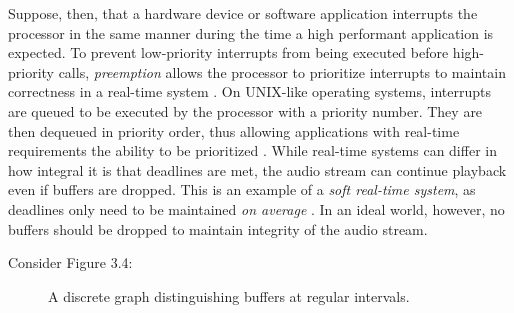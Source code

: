 Suppose, then, that a hardware device or software application interrupts the processor in the same manner during the time a high performant application is expected. To prevent low-priority interrupts from being executed before high-priority calls, \textit{preemption} allows the processor to prioritize interrupts to maintain correctness in a real-time system \cite{realtime-linux}. On UNIX-like operating systems, interrupts are queued to be executed by the processor with a priority number. They are then dequeued in priority order, thus allowing applications with real-time requirements the ability to be prioritized \cite{posix4}. While real-time systems can differ in how integral it is that deadlines are met, the audio stream can continue playback even if buffers are dropped. This is an example of a \textit{soft real-time system}, as deadlines only need to be maintained \textit{on average} \cite{realtime-linux}. In an ideal world, however, no buffers should be dropped to maintain integrity of the audio stream.

Consider Figure 3.4:

\begin{figure}[h] %
	\begin{center}
		\caption{A discrete graph distinguishing buffers at regular intervals.}
	\end{center}
\end{figure}

